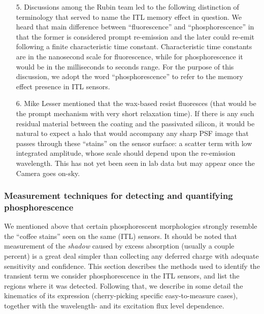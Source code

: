 \begin{itemize}
    \item[5.] Discussions among the Rubin team led to the following distinction of terminology that served to name the ITL memory effect in question. We heard that main difference between ``fluorescence'' and ``phosphorescence'' in that the former is considered prompt re-emission and the later could re-emit following a finite characteristic time constant. Characteristic time constants are in the nanosecond scale for fluorescence, while for phosphorescence it would be in the milliseconds to seconds range. For the purpose of this discussion, we adopt the word ``phosphorescence'' to refer to the memory effect presence in ITL sensors.
    \item[6.] Mike Lesser mentioned that the wax-based resist fluoresces (that would be the prompt mechanism with very short relaxation time). If there is any such residual material between the coating and the passivated silicon, it would be natural to expect a halo that would accompany any sharp PSF image that passes through these ``stains'' on the sensor surface: a scatter term with low integrated amplitude, whose scale should depend upon the re-emission wavelength. This has not yet been seen in lab data but may appear once the Camera goes on-sky.
    
\end{itemize}

\subsubsection{Measurement techniques for detecting and quantifying phosphorescence}\label{phos-measurement}
We mentioned above that certain phosphorescent morphologies strongly resemble the ``coffee stains'' seen on the same (ITL) sensors. It should be noted that measurement of the {\it shadow} caused by excess absorption (usually a couple percent) is a great deal simpler than collecting any deferred charge with adequate sensitivity and confidence. This section describes the methods used to identify the transient term we consider phosphorescence in the ITL sensors, and list the regions where it was detected. Following that, we describe in some detail the kinematics of its expression (cherry-picking specific easy-to-measure cases), together with the wavelength- and its excitation flux level dependence.


